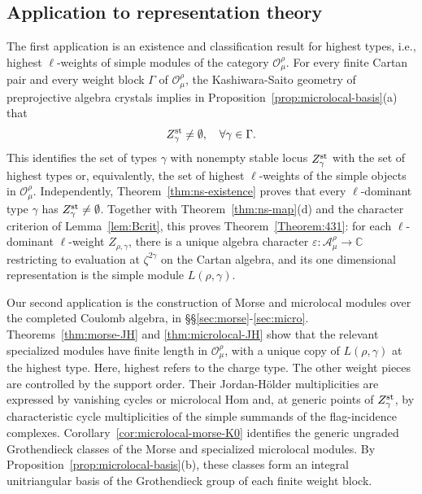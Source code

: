 \documentclass[11pt,reqno]{amsart}
\theoremstyle{definition}
\theoremstyle{remark}
\def\bbC{\mathbb C}
\def\scrO{\mathscr O}
\def\calA{\mathcal A}
\begin{document}
\subsection{Application to representation theory}
The first application is an existence and classification result for highest types, i.e., 
highest $\ell$-weights of simple modules of the category $\scrO_\mu^\rho$. 
For every finite Cartan pair and every weight block
$\Gamma$ of $\scrO_\mu^\rho$, the Kashiwara-Saito geometry of
preprojective algebra crystals \cite{KS97} implies in Proposition~\ref{prop:microlocal-basis}(a) that
\[
Z_\gamma^{\rm st}\ne\emptyset,\quad\forall \gamma\in \Gamma.
\]
This identifies the set of types $\gamma$ with nonempty stable locus $Z_\gamma^{\rm st}$
with the set of highest types or, equivalently, the set of highest $\ell$-weights of the 
simple objects in $\scrO_\mu^\rho$.
Independently, Theorem~\ref{thm:ns-existence} proves that every
$\ell$-dominant type $\gamma$ has
$Z_\gamma^{\rm st}\ne\emptyset$.
Together with Theorem~\ref{thm:ns-map}(d) and the character criterion
of Lemma~\ref{lem:Bcrit}, this proves
Theorem~\ref{Theorem:431}: for each $\ell$-dominant $\ell$-weight
$Z_{\rho,\gamma}$, there is a unique algebra character
$\varepsilon:\calA_\mu^\rho\to\bbC$ restricting to evaluation at
$\zeta^{2\gamma}$ on the Cartan algebra, and its one dimensional
representation is the simple module $L(\rho,\gamma)$. 

Our second application is the construction of Morse and microlocal
modules over the completed Coulomb algebra, in
\S\S\ref{sec:morse}-\ref{sec:micro}.  Theorems~\ref{thm:morse-JH} and
\ref{thm:microlocal-JH} show that the relevant specialized modules
have finite length in $\scrO_\mu^\rho$, with a unique copy of
$L(\rho,\gamma)$ at the highest type. 
Here, highest refers to the charge type. The other weight pieces
are controlled by the support order.
Their Jordan-H\"older multiplicities are expressed by vanishing cycles or microlocal Hom
and, at generic points of $Z_\gamma^{\rm st}$, by
characteristic cycle multiplicities of the simple summands of the
flag-incidence complexes. Corollary~\ref{cor:microlocal-morse-K0}
identifies the generic ungraded Grothendieck classes of the Morse
and specialized microlocal modules. By
Proposition~\ref{prop:microlocal-basis}(b), these classes
form an integral unitriangular basis of the Grothendieck group of
each finite weight block. 
\end{document}
